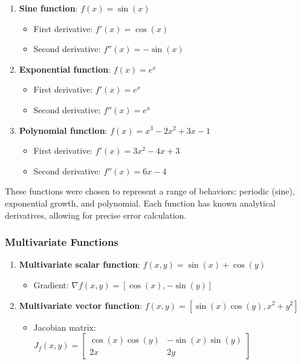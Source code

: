 \documentclass[11pt,a4paper]{article}
\begin{document}
\begin{enumerate}
    \item \textbf{Sine function}: $f(x) = \sin(x)$
    \begin{itemize}
        \item First derivative: $f'(x) = \cos(x)$
        \item Second derivative: $f''(x) = -\sin(x)$
    \end{itemize}
    
    \item \textbf{Exponential function}: $f(x) = e^x$
    \begin{itemize}
        \item First derivative: $f'(x) = e^x$
        \item Second derivative: $f''(x) = e^x$
    \end{itemize}
    
    \item \textbf{Polynomial function}: $f(x) = x^3 - 2x^2 + 3x - 1$
    \begin{itemize}
        \item First derivative: $f'(x) = 3x^2 - 4x + 3$
        \item Second derivative: $f''(x) = 6x - 4$
    \end{itemize}
\end{enumerate}

These functions were chosen to represent a range of behaviors: periodic (sine), exponential growth, and polynomial. Each function has known analytical derivatives, allowing for precise error calculation.

\subsubsection{Multivariate Functions}

\begin{enumerate}
    \item \textbf{Multivariate scalar function}: $f(x,y) = \sin(x) + \cos(y)$
    \begin{itemize}
        \item Gradient: $\nabla f(x,y) = [\cos(x), -\sin(y)]$
    \end{itemize}
    
    \item \textbf{Multivariate vector function}: $f(x,y) = [\sin(x)\cos(y), x^2 + y^2]$
    \begin{itemize}
        \item Jacobian matrix: $J_f(x,y) = \begin{bmatrix} \cos(x)\cos(y) & -\sin(x)\sin(y) \\ 2x & 2y \end{bmatrix}$
    \end{itemize}
\end{enumerate}
\end{document}
